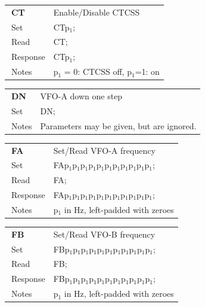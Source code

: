 \documentclass[12pt]{book}
\begin{document}
\begin{center}
\begin{tabular}{|p{2cm}|p{11cm}|}
\toprule
$\phantom{\Big|}$\textbf{\large CT} & Enable/Disable CTCSS \\\cline{1-2}
$\phantom{\Big|}${\large Set} & {CTp$_1$;} \\\hline
$\phantom{\Big|}${\large Read} & {CT;} \\\hline
$\phantom{\Big|}${\large Response} & {CTp$_1$;} \\\hline
$\phantom{\Big|}${\large Notes} & \multicolumn{1}{|p{11cm}|}{p$_1$ = 0: CTCSS off, p$_1$=1: on} \\
\bottomrule
\end{tabular}
\end{center}

\begin{center}
\begin{tabular}{|p{2cm}|p{11cm}|}
\toprule
$\phantom{\Big|}$\textbf{\large DN} & VFO-A down  one step \\\cline{1-2}
$\phantom{\Big|}${\large Set} & {DN;} \\\hline
$\phantom{\Big|}${\large Notes} & \multicolumn{1}{|p{11cm}|}{Parameters may be given, but are ignored.} \\
\bottomrule
\end{tabular}
\end{center}

\begin{center}
\begin{tabular}{|p{2cm}|p{11cm}|}
\toprule
$\phantom{\Big|}$\textbf{\large FA} & Set/Read VFO-A frequency \\\cline{1-2}
$\phantom{\Big|}${\large Set} & {FAp$_1$p$_1$p$_1$p$_1$p$_1$p$_1$p$_1$p$_1$p$_1$p$_1$p$_1$;} \\\hline
$\phantom{\Big|}${\large Read} & {FA;} \\\hline
$\phantom{\Big|}${\large Response} & {FAp$_1$p$_1$p$_1$p$_1$p$_1$p$_1$p$_1$p$_1$p$_1$p$_1$p$_1$;} \\\hline
$\phantom{\Big|}${\large Notes} & \multicolumn{1}{|p{11cm}|}{p$_1$ in Hz, left-padded with zeroes} \\
\bottomrule
\end{tabular}
\end{center}

\begin{center}
\begin{tabular}{|p{2cm}|p{11cm}|}
\toprule
$\phantom{\Big|}$\textbf{\large FB} & Set/Read VFO-B frequency \\\cline{1-2}
$\phantom{\Big|}${\large Set} & {FBp$_1$p$_1$p$_1$p$_1$p$_1$p$_1$p$_1$p$_1$p$_1$p$_1$p$_1$;} \\\hline
$\phantom{\Big|}${\large Read} & {FB;} \\\hline
$\phantom{\Big|}${\large Response} & {FBp$_1$p$_1$p$_1$p$_1$p$_1$p$_1$p$_1$p$_1$p$_1$p$_1$p$_1$;} \\\hline
$\phantom{\Big|}${\large Notes} & \multicolumn{1}{|p{11cm}|}{p$_1$ in Hz, left-padded with zeroes} \\
\bottomrule
\end{tabular}
\end{center}
\end{document}
